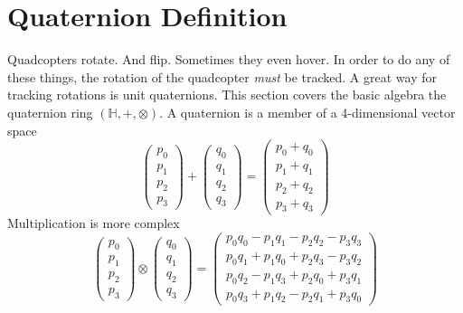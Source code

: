 \documentclass[lettersize,journal]{IEEEtran}
\begin{document}

\appendices
\section*{Quaternion Definition}
Quadcopters rotate. And flip. Sometimes they even hover. In order to do any of these things, the rotation of the quadcopter \emph{must} be tracked. A great way for tracking rotations is unit quaternions. This section covers the basic algebra the quaternion ring $\left(\mathbb{H}, +, \otimes\right)$.
A quaternion is a member of a 4-dimensional vector space
\begin{equation}
  \begin{pmatrix}
    p_0 \\
    p_1 \\
    p_2 \\
    p_3
  \end{pmatrix} +
  \begin{pmatrix}
    q_0 \\
    q_1 \\
    q_2 \\
    q_3
  \end{pmatrix} =
  \begin{pmatrix}
    p_0 + q_0 \\
    p_1 + q_1 \\
    p_2 + q_2 \\
    p_3 + q_3
  \end{pmatrix}
\end{equation}
Multiplication is more complex
\begin{equation}
 \begin{pmatrix}
    p_0 \\
    p_1 \\
    p_2 \\
    p_3
  \end{pmatrix} \otimes 
  \begin{pmatrix}
    q_0 \\
    q_1 \\
    q_2 \\
    q_3
  \end{pmatrix} =
  \begin{pmatrix}
    p_0q_0 - p_1q_1 - p_2q_2 - p_3q_3 \\
    p_0q_1 + p_1q_0 + p_2q_3 - p_3q_2 \\
    p_0q_2 - p_1q_3 + p_2q_0 + p_3q_1 \\
    p_0q_3 + p_1q_2 - p_2q_1 + p_3q_0
  \end{pmatrix}
\end{equation}
\end{document}
